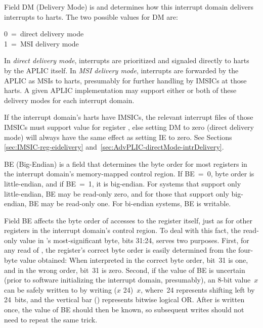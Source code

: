 Field DM (Delivery Mode) is {\WARL} and determines how this interrupt
domain delivers interrupts to harts.
The two possible values for DM are:
\begin{displayLinesTable}
0~=~direct delivery mode\\
1~=~MSI delivery mode\\
\end{displayLinesTable}
In \emph{direct delivery mode}, interrupts are prioritized and signaled
directly to harts by the APLIC itself.
In \emph{MSI delivery mode}, interrupts are forwarded by the APLIC
as MSIs to harts, presumably for further handling by IMSICs at those
harts.
A given APLIC implementation may support either or both of these
delivery modes for each interrupt domain.

If the interrupt domain's harts have IMSICs, the relevant interrupt
files of those IMSICs must support value  for register
, else setting DM to zero (direct delivery mode) will
always have the same effect as setting IE to zero.
See Sections \ref{sec:IMSIC-reg-eidelivery}
and~\ref{sec:AdvPLIC-directMode-intrDelivery}.

BE (Big-Endian) is a {\WARL} field that determines the byte order for
most registers in the interrupt domain's memory-mapped control region.
If BE~=~0, byte order is little-endian, and if BE~=~1, it is
big-endian.
For {\RISCV} systems that support only little-endian, BE may be
read-only zero, and for those that support only big-endian, BE may be
read-only one.
For bi-endian systems, BE is writable.

Field BE affects the byte order of accesses to the 
register itself, just as for other registers in the interrupt domain's
control region.
To deal with this fact, the read-only value in 's
most-significant byte, bits 31:24, serves two purposes.
First, for any read of , the register's correct byte order
is easily determined from the four-byte value obtained:
When interpreted in the correct byte order, bit~31 is one, and in the
wrong order, bit~31 is zero.
Second, if the value of BE is uncertain (prior to software
initializing the interrupt domain, presumably), an \mbox{8-bit}
value~$x$ can be safely written to  by writing
\mbox{($x$\,\z{<<}\,24) \z{|} $x$}, where \mbox{\z{<<}\,24} represents
shifting left by 24~bits, and the vertical bar (\z{|}) represents
bitwise logical OR.
After  is written once, the value of BE should then be
known, so subsequent writes should not need to repeat the same trick.

